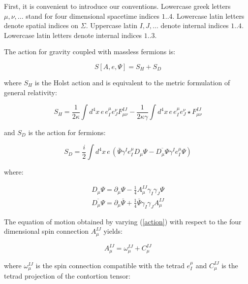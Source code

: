 \begin{doublespace}
First, it is convenient to introduce our conventions.  Lowercase greek letters $\mu,\nu,...$ stand
for four dimensional spacetime indices $1..4$. Lowercase latin letters denote spatial indices on
$\Sigma$. Uppercase latin $I,J,...$ denote internal indices $1..4$. Lowercase latin letters denote
internal indices $1..3$.

The action for gravity coupled with massless fermions is:

\begin{equation}\label{action}
    S[A,e,\Psi] = S_{H} + S_{D}
\end{equation}

where $S_{H}$ is the Holst action and is equivalent to the metric formulation of general
relativity:

\begin{equation}\label{holst_action}
    S_{H} = \frac{1}{2\kappa}\int d^{4}x\,e\,e^{\mu}_{I}e^{\nu}_{J}F^{IJ}_{\mu\nu} -
    \frac{1}{2\kappa\gamma}\int d^{4}x\,e\,e^{\mu}_{I}e^{\nu}_{J}\star F^{IJ}_{\mu\nu}
\end{equation}

and $S_{D}$ is the action for fermions:

\begin{equation}\label{dirac_action}
    S_{D} = \frac{i}{2}\int d^{4}x\,e\,(\bar{\Psi}\gamma^{I}e^{\mu}_{I}D_{\mu}\Psi -
    \overline{D_{\mu}\Psi}\gamma^{I}e^{\mu}_{I}\Psi)
\end{equation}

where:

\begin{eqnarray}\label{covariant_derivative}
    D_{\mu}\Psi = \partial_{\mu}\Psi - \frac{1}{4}A_{\mu}^{IJ}\gamma_{I}\gamma_{J}\Psi \\
    \overline{D_{\mu}\Psi} = \partial_{\mu}\bar{\Psi} + \frac{1}{4}\bar{\Psi}\gamma_{I}\gamma_{J}A_{\mu}^{IJ}
\end{eqnarray}

The equation of motion obtained by varying (\ref{action}) with respect to the four dimensional spin
connection $A_{\mu}^{IJ}$ yields:

\begin{equation}\label{connection}
    A_{\mu}^{IJ}=\omega_{\mu}^{IJ} + C_{\mu}^{IJ}
\end{equation}

where $\omega_{\mu}^{IJ}$ is the spin connection compatible with the tetrad $e_{I}^{\mu}$ and
$C_{\mu}^{IJ}$ is the tetrad projection of the contortion tensor:


\end{doublespace}
